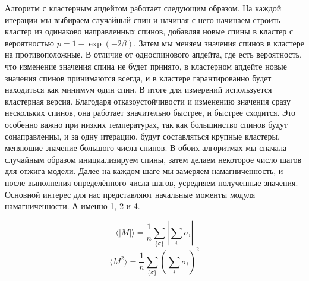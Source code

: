 Алгоритм с кластерным апдейтом работает следующим образом. На каждой итерации мы выбираем случайный спин и начиная с него начинаем строить кластер из одинаково направленных спинов, добавляя новые спины в кластер с вероятностью $p = 1 - \exp(-2\beta)$. Затем мы меняем значения спинов в кластере на противоположные. В отличие от односпинового апдейта, где есть вероятность, что изменение значения спина не будет принято, в кластерном апдейте новые значения спинов принимаются всегда, и в кластере гарантированно будет находиться как минимум один спин.
В итоге для измерений используется кластерная версия. Благодаря отказоустойчивости и изменению значения сразу нескольких спинов, она работает значительно быстрее, и быстрее сходится. Это особенно важно при низких температурах, так как большинство спинов будут сонаправленны, и за одну итерацию, будут составляться крупные кластеры, меняющие значение большого числа спинов. 
В обоих алгоритмах мы сначала случайным образом инициализируем спины, затем делаем некоторое число шагов для отжига модели. Далее на каждом шаге мы замеряем намагниченность, и после выполнения определённого числа шагов, усредняем полученные значения. Основной интерес для нас представляют начальные моменты модуля намагниченности. А именно 1, 2 и 4.

\[
\langle |M|\rangle = \frac{1}{n} \sum_{\{\sigma\}} \left| \sum_i \sigma_i \right|
\]
\[
\langle M^2\rangle = \frac{1}{n} \sum_{\{\sigma\}} \left( \sum_i \sigma_i \right)^2
\]